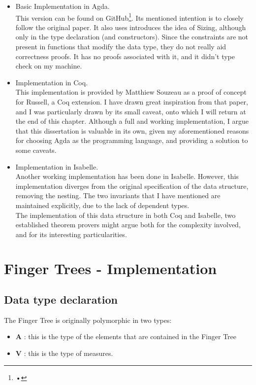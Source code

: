 \documentclass[12pt,twoside,notitlepage]{report}
\begin{document}
\begin{itemize}
\item Basic Implementation in Agda. \\
This version can be found on GitHub\footnote{•}. Its mentioned intention is to closely follow the original paper. It also uses introduces the idea of Sizing, although only in the type declaration (and constructors). Since the constraints are not present in functions that modify the data type, they do not really aid correctness proofs. It has no proofs associated with it, and it didn't type check on my machine.
\item Implementation in Coq. \\
This implementation is provided by Matthiew Souzeau\cite{coq} as a proof of concept for Russell, a Coq extension. I have drawn great inspiration from that paper, and I was particularly drawn by its small caveat, onto which I will return at the end of this chapter. Although a full and working implementation, I argue that this dissertation is valuable in its own, given my aforementioned reasons for choosing Agda as the programming language, and providing a solution to some caveats.
\item Implementation in Isabelle. \\
Another working implementation has been done in Isabelle. However, this implementation diverges from the original specification of the data structure, removing the nesting. The two invariants that I have mentioned are maintained explicitly, due to the lack of dependent types.\\ 
The implementation of this data structure in both Coq and Isabelle, two established theorem provers might argue both for the complexity involved, and for its interesting particularities.
\end{itemize}

\section{Finger Trees - Implementation}

\subsection{Data type declaration}

The Finger Tree is originally polymorphic in two types:
\begin{itemize}
\item \textbf{A} : this is the type of the elements that are contained in the Finger Tree 
\item \textbf{V} : this is the type of measures. 
\end{itemize} 
\end{document}
